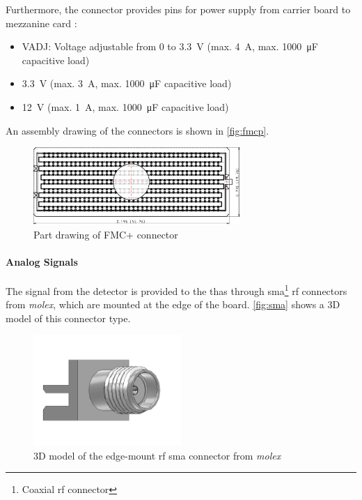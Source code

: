 Furthermore, the connector provides pins for power supply from carrier board to mezzanine card \cite{fmc}:
\begin{itemize}
	\item VADJ: Voltage adjustable from 0 to \SI{3.3}{\volt} (max. \SI{4}{\ampere}, max. \SI{1000}{\micro \farad} capacitive load) 
	\item \SI{3.3}{\volt} (max. \SI{3}{\ampere}, max. \SI{1000}{\micro \farad} capacitive load)
	\item \SI{12}{\volt} (max. \SI{1}{\ampere}, max. \SI{1000}{\micro \farad} capacitive load)
\end{itemize}

An assembly drawing of the connectors is shown in \autoref{fig:fmcp}.

\begin{figure}[tbh]
	\centering
	\includegraphics[width = 0.7\textwidth]{chap/04-work/img/fmcp.pdf}
	\caption[Rendering of FMC+ connector]{Part drawing of FMC+ connector \cite{fmcpic}}
	\label{fig:fmcp}
\end{figure}

\paragraph{Analog Signals}
The signal from the detector is provided to the \glspl{tha} through \gls{sma}\footnote{Coaxial \gls{rf} connector} \gls{rf} connectors from \textit{molex}, which are mounted at the edge of the board.
\autoref{fig:sma} shows a 3D model of this connector type. 

\begin{figure}[tbh]
	\centering
	\includegraphics[width = 0.5\textwidth]{chap/04-work/img/sma}
	\caption[Edge-Mount RF SMA connector]{3D model of the edge-mount \gls{rf} \gls{sma} connector from \textit{molex} \cite{molex}}
	\label{fig:sma}
\end{figure}

